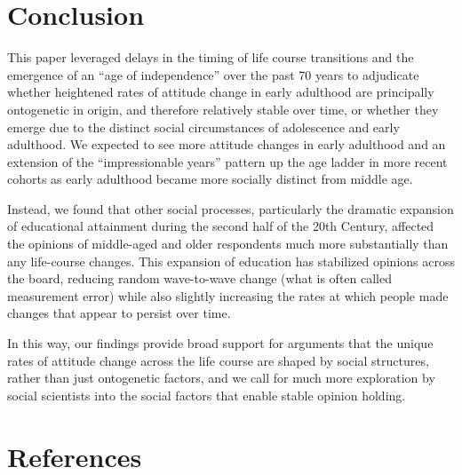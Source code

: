 \documentclass[
  12pt,
]{article}
\begin{document}
\hypertarget{conclusion}{%
\section{Conclusion}\label{conclusion}}

This paper leveraged delays in the timing of life course transitions and the emergence of an ``age of independence'' over the past 70 years to adjudicate whether heightened rates of attitude change in early adulthood are principally ontogenetic in origin, and therefore relatively stable over time, or whether they emerge due to the distinct social circumstances of adolescence and early adulthood. We expected to see more attitude changes in early adulthood and an extension of the ``impressionable years'' pattern up the age ladder in more recent cohorts as early adulthood became more socially distinct from middle age.

Instead, we found that other social processes, particularly the dramatic expansion of educational attainment during the second half of the 20th Century, affected the opinions of middle-aged and older respondents much more substantially than any life-course changes. This expansion of education has stabilized opinions across the board, reducing random wave-to-wave change (what is often called measurement error) while also slightly increasing the rates at which people made changes that appear to persist over time.

In this way, our findings provide broad support for arguments that the unique rates of attitude change across the life course are shaped by social structures, rather than just ontogenetic factors, and we call for much more exploration by social scientists into the social factors that enable stable opinion holding.

\hypertarget{references}{%
\section{References}\label{references}}

\singlespace
\end{document}
